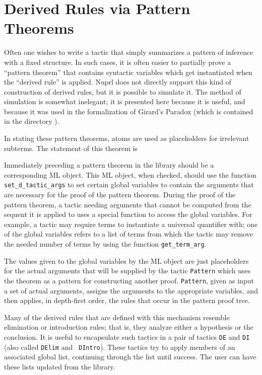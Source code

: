 \section{Derived Rules via Pattern Theorems}

Often one wishes to write a tactic that simply summarizes a pattern of
inference with a fixed structure.  In such cases, it is often easier to
partially prove a ``pattern theorem'' that contains syntactic variables which
get instantiated when the ``derived rule'' is applied.  Nuprl does not
directly support this kind of construction of derived rules, but it is
possible to simulate it.  The method of simulation is somewhat inelegant; it
is presented here because it is useful, and because it was used in the
formalization of Girard's Paradox (which is contained in the directory
).

In stating these pattern
theorems, atoms are used as
placeholders for irrelevant subterms.  The statement of this theorem is 
\begin{Numath}
\end{Numath}%

Immediately preceding a pattern theorem in the library should be a
corresponding ML object.  This ML object, when checked, should use the function
{\tt set\_\-d\_tactic\_\-args} to set certain global variables to contain the
arguments that are necessary for the proof of the pattern theorem.  
During the proof of the pattern theorem, a tactic needing arguments that
cannot be computed from the sequent it is applied to uses a special function to
access the global variables.  For example, a tactic may require terms to
instantiate a universal quantifier with; one of the global variables refers to
a list of terms from which the tactic may remove the needed number of terms by
using the function {\tt get\_term\_arg}.

The values given to the global variables by the ML object are just
placeholders for the actual
arguments that will be supplied by the tactic {\tt Pattern} which uses the
theorem as a pattern for
constructing another proof.  {\tt Pattern}, given
as input a set of actual arguments, assigns the arguments to the
appropriate variables, and then applies, in depth-first order, the rules that
occur in the pattern proof tree.  

Many of the derived rules that are defined with this mechanism resemble
elimination or introduction rules; that is, they analyze either a hypothesis
or the conclusion.  It is useful to encapsulate such tactics in a pair
of tactics {\tt DE} and {\tt DI} (also called {\tt DElim} and {\tt
DIntro}).  These tactics try to apply members of an associated
global list, continuing through the list until success.  The user can have
these lists updated from the library.



